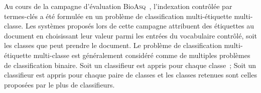     Au cours de la campagne d'évaluation
    Bio\textsc{Asq}~\cite{partalas2013bioasq}, l'indexation contrôlée par
    termes-clés a été formulée en un problème de classification multi-étiquette
    multi-classe. Les systèmes proposés lors de cette campagne attribuent des
    étiquettes au document en choisissant leur valeur parmi les entrées du
    vocabulaire contrôlé, soit les classes que peut prendre le document. Le
    problème de classification multi-étiquette multi-classe est généralement
    considéré comme de multiples problèmes de classification binaire. Soit un
    classifieur est appris pour chaque classe~; Soit un classifieur est appris
    pour chaque paire de classes et les classes retenues sont celles proposées
    par le plus de classifieurs.


